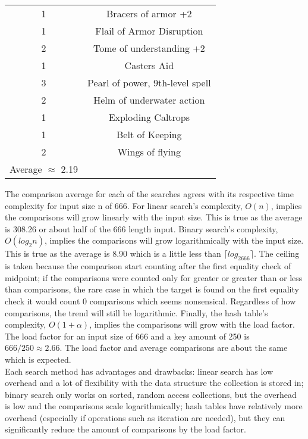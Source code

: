 \documentclass[letterpaper, 10pt]{article}
\begin{document}
\begin{center}
\begin{tabular}{|| c c ||}
    1  & Bracers of armor +2\\
    1  & Flail of Armor Disruption\\
    2  & Tome of understanding +2\\
    1  & Casters Aid\\
    3  & Pearl of power, 9th-level spell\\
    2  & Helm of underwater action\\
    1  & Exploding Caltrops\\
    1  & Belt of Keeping\\
    2  & Wings of flying\\
    \hline
    Average $\approx$ 2.19 & \\
    \hline
    \hline
    \end{tabular}
\end{center}
\newpage
\noindent
The comparison average for each of the searches agrees with its respective time complexity
for input size n of 666. For linear search's complexity, $O(n)$, implies the comparisons will grow linearly with
the input size. This is true as the average is 308.26 or about half of the 666 length input. Binary
search's complexity, $O(log_2n)$, implies the comparisons will grow logarithmically with the input size.
This is true as the average is 8.90 which is a little less than $\lceil log_2666\rceil$.
The ceiling is taken because the comparison start counting after the first equality check of midpoint;
if the comparisons were counted only for greater or greater than or less than comparisons, the rare 
case in which the target is found on the first equality check it would count 0 comparisons which
seems nonsensical. Regardless of how comparisons, the trend will still be logarithmic. Finally,
the hash table's complexity, $O(1 + \alpha)$, implies the comparisons will grow with the load factor.
The load factor for an input size of 666 and a key amount of 250 is $666/250\approx2.66$. The load factor
and average comparisons are about the same which is expected.\\
\newline
Each search method has advantages and drawbacks: linear search has low overhead and a lot of
flexibility with the data structure the collection is stored in; binary search only works on sorted,
random access collections, but the overhead is low and the comparisons scale logarithmically;
hash tables have relatively more overhead (especially if operations such as iteration are needed),
but they can significantly reduce the amount of comparisons by the load factor.
\end{document}
